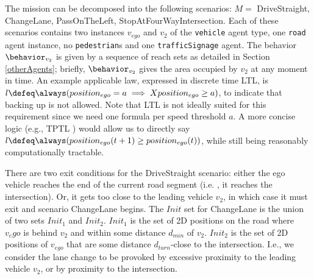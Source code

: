 \begin{exmp}
	The mission can be decomposed into the following scenarios:
	$M = $ DriveStraight, ChangeLane, PassOnTheLeft, StopAtFourWayIntersection.
	Each of these scenarios contains two instances $v_{ego}$ and $v_2$ of the \texttt{vehicle} agent type, one \texttt{road} agent instance, no \texttt{pedestrian}s and one \texttt{trafficSignage} agent.
	The behavior $\behavior_{v_2}$ is given by a sequence of reach sets as detailed in Section \ref{otherAgents};
	briefly, $\behavior_{v_2}$ gives the area occupied by $v_2$ at any moment in time.
	An example applicable law, expressed in discrete time LTL, is $l \defeq \always(position_{ego} = a \implies X position_{ego} \geq a)$, to indicate that backing up is not allowed.
	Note that LTL is not ideally suited for this requirement since we need one formula per speed threshold $a$. A more concise logic (e.g., TPTL \cite{alur94_really}) would allow us to directly say $l \defeq \always(position_{ego}(t+1) \geq position_{ego}(t))$, while still being reasonably computationally tractable.
		
	There are two exit conditions for the DriveStraight scenario: either the ego vehicle reaches the end of the current road segment (i.e. , it reaches the intersection). 
	Or, it gets too close to the leading vehicle $v_2$, in which case it must exit and scenario ChangeLane begins.
	The $Init$ set for ChangeLane is the union of two sets $Init_1$ and $Init_2$.
	$Init_1$ is the set of 2D positions on the road where $v_ego$ is behind $v_2$ and within some distance $d_{min}$ of $v_2$.
	$Init_2$ is the set of 2D positions of $v_{ego}$ that are some distance $d_{turn}$-close to the intersection.
	I.e., we consider the lane change to be provoked by excessive proximity to the leading vehicle $v_2$, or by proximity to the intersection.	
\end{exmp}